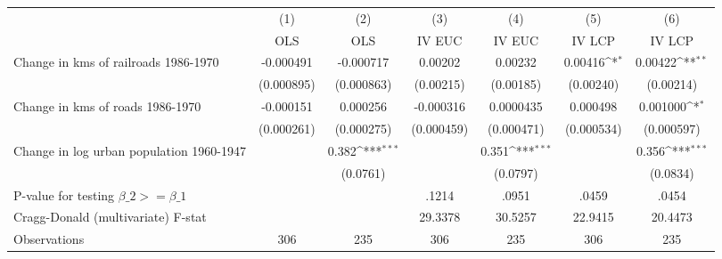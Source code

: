 {
\def\sym#1{\ifmmode^{#1}\else\(^{#1}\)\fi}
\begin{tabular}{l*{6}{c}}
\hline\hline
                &\multicolumn{1}{c}{(1)}&\multicolumn{1}{c}{(2)}&\multicolumn{1}{c}{(3)}&\multicolumn{1}{c}{(4)}&\multicolumn{1}{c}{(5)}&\multicolumn{1}{c}{(6)}\\
                &\multicolumn{1}{c}{OLS}&\multicolumn{1}{c}{OLS}&\multicolumn{1}{c}{IV EUC}&\multicolumn{1}{c}{IV EUC}&\multicolumn{1}{c}{IV LCP}&\multicolumn{1}{c}{IV LCP}\\
\hline
Change in kms of railroads 1986-1970&-0.000491         &-0.000717         &  0.00202         &  0.00232         &  0.00416\sym{*}  &  0.00422\sym{**} \\
                &(0.000895)         &(0.000863)         &(0.00215)         &(0.00185)         &(0.00240)         &(0.00214)         \\
[1em]
Change in kms of roads 1986-1970&-0.000151         & 0.000256         &-0.000316         &0.0000435         & 0.000498         & 0.001000\sym{*}  \\
                &(0.000261)         &(0.000275)         &(0.000459)         &(0.000471)         &(0.000534)         &(0.000597)         \\
[1em]
Change in log urban population 1960-1947&                  &    0.382\sym{***}&                  &    0.351\sym{***}&                  &    0.356\sym{***}\\
                &                  & (0.0761)         &                  & (0.0797)         &                  & (0.0834)         \\
\hline
P-value for testing $\beta\_{2} >= \beta\_{1}$&                  &                  &    .1214         &    .0951         &    .0459         &    .0454         \\
Cragg-Donald (multivariate) F-stat&                  &                  &  29.3378         &  30.5257         &  22.9415         &  20.4473         \\
Observations    &      306         &      235         &      306         &      235         &      306         &      235         \\
\hline\hline
\end{tabular}
}
